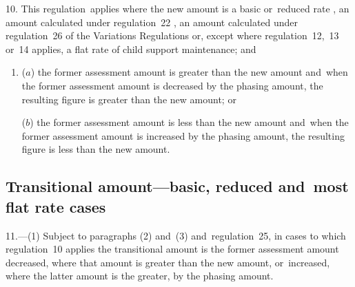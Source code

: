 \documentclass[12pt,a4paper]{article}
\begin{document}
10.  This regulation~applies where the new amount is a basic or~reduced rate%
, an amount calculated under regulation~22%
, an amount calculated under regulation~26 of the Variations Regulations  %
or, except where regulation~12,~13 or~14 applies, a flat rate of child support maintenance; and
\begin{enumerate}\item[]
($a$) the former assessment amount is greater than the new amount and~when the former assessment amount is decreased by the phasing amount, the resulting figure is greater than the new amount; or

($b$) the former assessment amount is less than the new amount and~when the former assessment amount is increased by the phasing amount, the resulting figure is less than the new amount.
\end{enumerate}


\subsection[11. Transitional amount—basic, reduced and~most flat rate cases]{\sloppy Transitional amount—basic, reduced and~most flat rate cases}

11.---(1)  Subject to 
paragraphs (2) and~(3)  %
and~regulation~25, in cases to which regulation~10 applies the transitional amount is the former assessment amount decreased, where that amount is greater than the new amount, or~increased, where the latter amount is the greater, by the phasing amount.

%
\end{document}
